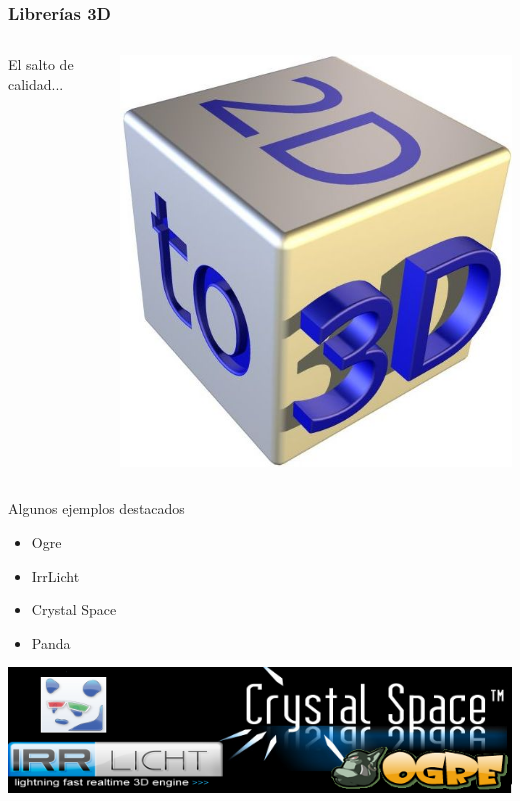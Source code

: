 \begin{frame}
	\frametitle{Librerías 3D}
	\begin{columns}[c]
		\column{150pt}
			El salto de calidad...
		\column{150pt}
			\begin{center}
				\includegraphics[scale=0.05]{img/2dto3d.jpg}
			\end{center}
	\end{columns}
	\begin{block}{Algunos ejemplos destacados}
		\begin{itemize}
			\item Ogre
			\item IrrLicht
			\item Crystal Space
			\item Panda
		\end{itemize}
	\end{block}

	\begin{center}
		\includegraphics[scale=0.45]{img/logos.png}
	\end{center}

\end{frame}

